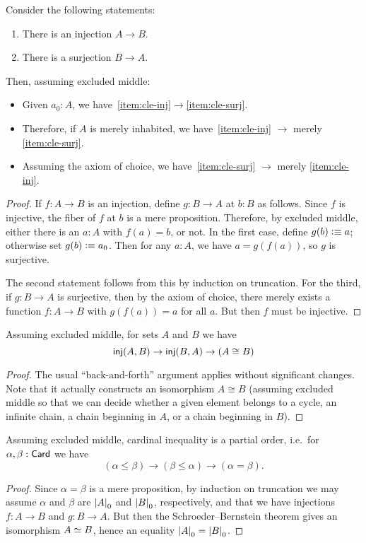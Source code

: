 \begin{lem}\label{thm:injsurj}
  Consider the following statements:
  \begin{enumerate}
  \item There is an injection $A\to B$.\label{item:cle-inj}
  \item There is a surjection $B\to A$.\label{item:cle-surj}
  \end{enumerate}
  Then, assuming excluded middle:
  \begin{itemize}
  \item Given $a_0:A$, we have~\ref{item:cle-inj}$\to$\ref{item:cle-surj}.
  \item Therefore, if $A$ is merely inhabited, we have~\ref{item:cle-inj} $\to$ merely \ref{item:cle-surj}.
  \item Assuming the axiom of choice, we have~\ref{item:cle-surj} $\to$ merely \ref{item:cle-inj}.
  \end{itemize}
\end{lem}
\begin{proof}
  If $f:A\to B$ is an injection, define $g:B\to A$ at $b:B$ as follows.
  Since $f$ is injective, the fiber of $f$ at $b$ is a mere proposition.
  Therefore, by excluded middle, either there is an $a:A$ with $f(a)=b$, or not.
  In the first case, define $g(b)\vcentcolon\equiv a$; otherwise set $g(b)\vcentcolon\equiv a_0$.
  Then for any $a:A$, we have $a = g(f(a))$, so $g$ is surjective.

  The second statement follows from this by induction on truncation.
  For the third, if $g:B\to A$ is surjective, then by the axiom of choice, there merely exists a function $f:A\to B$ with $g(f(a)) = a$ for all $a$.
  But then $f$ must be injective.
\end{proof}

\begin{thm}
  Assuming excluded middle, for sets $A$ and $B$ we have
  \[ \mathsf{inj}(A,B) \to \mathsf{inj}(B,A) \to (A\cong B) \]
\end{thm}
\begin{proof}
  The usual ``back-and-forth'' argument applies without significant changes.
  Note that it actually constructs an isomorphism $A\cong B$ (assuming excluded middle so that we can decide whether a given element belongs to a cycle, an infinite chain, a chain beginning in $A$, or a chain beginning in $B$).
\end{proof}

\begin{cor}
  Assuming excluded middle, cardinal inequality is a partial order, i.e.\ for $\alpha,\beta:\mathsf{Card}$ we have
  \[ (\alpha\le\beta) \to (\beta\le\alpha) \to (\alpha=\beta). \]
\end{cor}
\begin{proof}
  Since $\alpha=\beta$ is a mere proposition, by induction on truncation we may assume $\alpha$ and $\beta$ are $\mathopen{}\left|A\right|_{0}^{}\mathclose{}$ and $\mathopen{}\left|B\right|_{0}^{}\mathclose{}$, respectively, and that we have injections $f:A\to B$ and $g:B\to A$.
  But then the Schroeder--Bernstein theorem gives an isomorphism $A\simeq B$, hence an equality $\mathopen{}\left|A\right|_{0}^{}\mathclose{}=\mathopen{}\left|B\right|_{0}^{}\mathclose{}$.
\end{proof}

